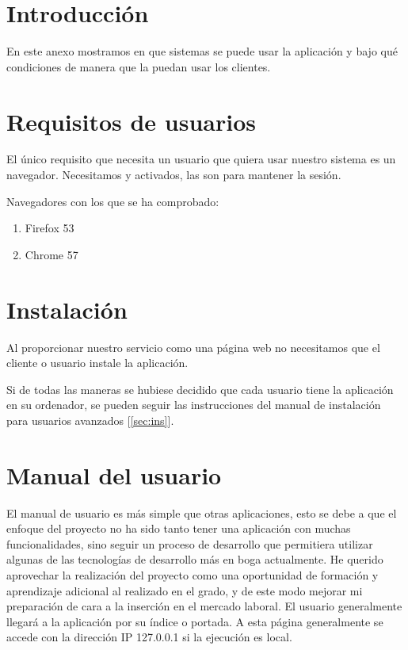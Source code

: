 
\section{Introducción}
En este anexo mostramos en que sistemas se puede usar la aplicación y bajo qué condiciones de manera que la puedan usar los clientes.

\section{Requisitos de usuarios}
El único requisito que necesita un usuario que quiera usar nuestro sistema es un navegador. Necesitamos  y  activados, las  son para mantener la sesión.

Navegadores con los que se ha comprobado:
\begin{enumerate}
\item Firefox 53 
\item Chrome 57
\end{enumerate}


\section{Instalación}
Al proporcionar nuestro servicio como una página web no necesitamos que el cliente o usuario instale la aplicación. 

Si de todas las maneras se hubiese decidido que cada usuario tiene la aplicación en su ordenador, se pueden seguir las instrucciones del manual de instalación para usuarios avanzados [\ref{sec:ins}].

\section{Manual del usuario}
El manual de usuario es más simple que otras aplicaciones, esto se debe a que el enfoque del proyecto no ha sido tanto tener una aplicación con muchas funcionalidades, sino seguir un proceso de desarrollo que permitiera utilizar algunas de las tecnologías de desarrollo más en boga actualmente. He querido aprovechar la realización del proyecto como una oportunidad de formación y aprendizaje adicional al realizado en el grado, y de este modo mejorar mi preparación de cara a la inserción en el mercado laboral.
\FloatBarrier
El usuario generalmente llegará a la aplicación por su índice o portada. A esta página generalmente se accede con la dirección IP 127.0.0.1 si la ejecución es local.

